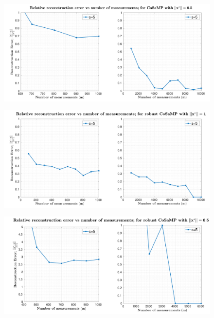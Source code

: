 \begin{figure}[t]
	\begin{center}
		\includegraphics[width=\linewidth]{./fig/plot-1-2.pdf}
	\end{center}
	\caption{}
	\label{fig:plot-1-2}
\end{figure}
%
\begin{figure}[t]
	\begin{center}
		\includegraphics[width=\linewidth]{./fig/plot-1-3.pdf}
	\end{center}
	\caption{}
	\label{fig:plot-1-3}
\end{figure}
%
\begin{figure}[t]
	\begin{center}
		\includegraphics[width=\linewidth]{./fig/plot-1-4.pdf}
	\end{center}
	\caption{}
	\label{fig:plot-1-4}
\end{figure}